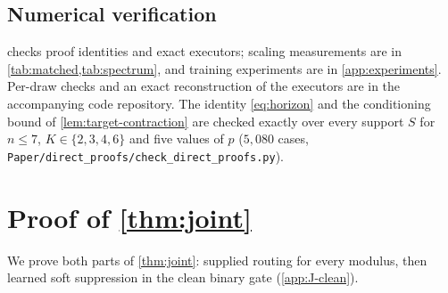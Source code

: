 \subsection{Numerical verification}
\label{app:verify}
 checks proof identities and exact executors; scaling measurements are in \cref{tab:matched,tab:spectrum},
and training experiments are in \cref{app:experiments}. Per-draw checks and an exact reconstruction of the executors are in the accompanying code repository. The identity
\cref{eq:horizon} and the conditioning bound of \cref{lem:target-contraction} are checked exactly over every support $S$ for $n\le7$,
$K\in\{2,3,4,6\}$ and five values of $p$ ($5{,}080$ cases, \texttt{Paper/direct\_proofs/check\_direct\_proofs.py}).

\begin{table}[htbp]
\centering\small
{}
\caption{\textbf{Checks of proof identities and exact executors.} The leading-coefficient check uses a two-block Transformer at width
$16$, $K=2$, with (A2), float64 and exact averaging over all words; the direction $\tilde{\bm\theta}$ is structured and
$\initscale\in\{0.02,0.05\}$. The executor check uses width $2{,}029$ on $532$ prompts.
Gradient and degree scaling measurements are in \cref{tab:matched,tab:spectrum}.}
\label{tab:verify}
\end{table}

\section{Proof of \texorpdfstring{\cref{thm:joint}}{Theorem 4}}
\label{app:joint}

\providecommand{\why}[1]{\text{\small(#1)}}

We prove both parts of \cref{thm:joint}: supplied routing for every modulus, then learned soft suppression in the clean binary gate
(\cref{app:J-clean}).

